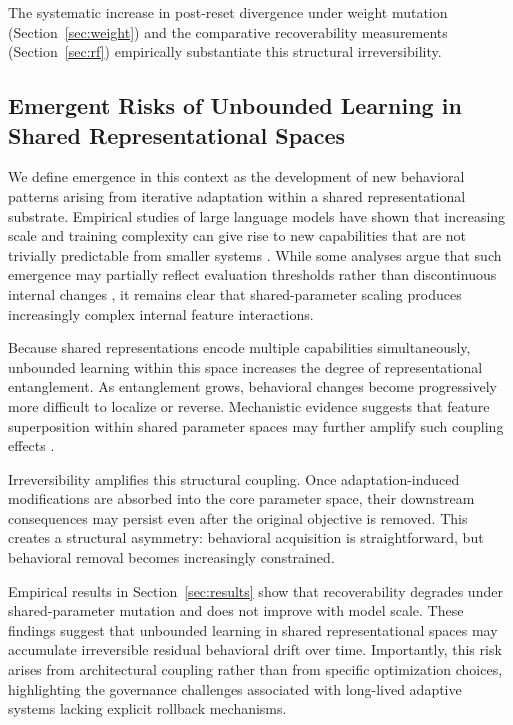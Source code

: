 \documentclass{article}
\begin{document}
	The systematic increase in post-reset divergence under weight mutation (Section~\ref{sec:weight}) and the comparative recoverability measurements (Section~\ref{sec:rf}) empirically substantiate this structural irreversibility.
	
	
	\subsection{Emergent Risks of Unbounded Learning in Shared Representational Spaces}
	\label{sec:analysis_emergence}
	
	We define emergence in this context as the development of new behavioral patterns arising from iterative adaptation within a shared representational substrate. Empirical studies of large language models have shown that increasing scale and training complexity can give rise to new capabilities that are not trivially predictable from smaller systems \cite{wei2022emergent}. While some analyses argue that such emergence may partially reflect evaluation thresholds rather than discontinuous internal changes \cite{schaeffer2023mirage}, it remains clear that shared-parameter scaling produces increasingly complex internal feature interactions.
	
	Because shared representations encode multiple capabilities simultaneously, unbounded learning within this space increases the degree of representational entanglement. As entanglement grows, behavioral changes become progressively more difficult to localize or reverse. Mechanistic evidence suggests that feature superposition within shared parameter spaces may further amplify such coupling effects \cite{elhage2022superposition}.
	
	Irreversibility amplifies this structural coupling. Once adaptation-induced modifications are absorbed into the core parameter space, their downstream consequences may persist even after the original objective is removed. This creates a structural asymmetry: behavioral acquisition is straightforward, but behavioral removal becomes increasingly constrained.
	
	Empirical results in Section~\ref{sec:results} show that recoverability degrades under shared-parameter mutation and does not improve with model scale. These findings suggest that unbounded learning in shared representational spaces may accumulate irreversible residual behavioral drift over time. Importantly, this risk arises from architectural coupling rather than from specific optimization choices, highlighting the governance challenges associated with long-lived adaptive systems lacking explicit rollback mechanisms.
	
\end{document}
